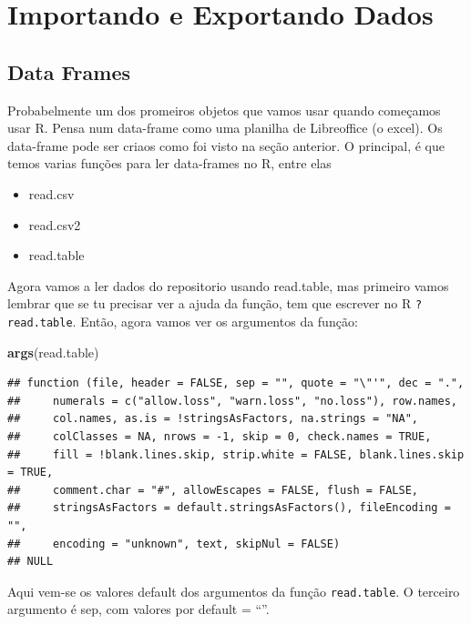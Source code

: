 \documentclass[]{book}
\newenvironment{Shaded}{\begin{snugshade}}{\end{snugshade}}
\newcommand{\KeywordTok}[1]{\textcolor[rgb]{0.13,0.29,0.53}{\textbf{#1}}}
\newcommand{\NormalTok}[1]{#1}
\providecommand{\tightlist}{%
  \setlength{\itemsep}{0pt}\setlength{\parskip}{0pt}}
\theoremstyle{definition}
\theoremstyle{definition}
\theoremstyle{definition}
\theoremstyle{remark}
\begin{document}
\chapter{Importando e Exportando
Dados}\label{importando-e-exportando-dados}

\section{Data Frames}\label{data-frames}

Probabelmente um dos promeiros objetos que vamos usar quando começamos
usar R. Pensa num data-frame como uma planilha de Libreoffice (o excel).
Os data-frame pode ser criaos como foi visto na seção anterior. O
principal, é que temos varias funções para ler data-frames no R, entre
elas

\begin{itemize}
\tightlist
\item
  read.csv
\item
  read.csv2
\item
  read.table
\end{itemize}

Agora vamos a ler dados do repositorio usando read.table, mas primeiro
vamos lembrar que se tu precisar ver a ajuda da função, tem que escrever
no R \texttt{?read.table}. Então, agora vamos ver os argumentos da
função:

\begin{Shaded}
\begin{Highlighting}[]
\KeywordTok{args}\NormalTok{(read.table)}
\end{Highlighting}
\end{Shaded}

\begin{verbatim}
## function (file, header = FALSE, sep = "", quote = "\"'", dec = ".", 
##     numerals = c("allow.loss", "warn.loss", "no.loss"), row.names, 
##     col.names, as.is = !stringsAsFactors, na.strings = "NA", 
##     colClasses = NA, nrows = -1, skip = 0, check.names = TRUE, 
##     fill = !blank.lines.skip, strip.white = FALSE, blank.lines.skip = TRUE, 
##     comment.char = "#", allowEscapes = FALSE, flush = FALSE, 
##     stringsAsFactors = default.stringsAsFactors(), fileEncoding = "", 
##     encoding = "unknown", text, skipNul = FALSE) 
## NULL
\end{verbatim}

Aqui vem-se os valores default dos argumentos da função
\texttt{read.table}. O terceiro argumento é sep, com valores por default
= ``''.
\end{document}

